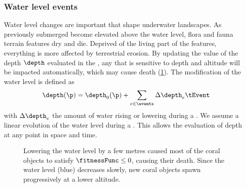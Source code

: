 \subsubsection{Water level events}
Water level changes are important  that shape underwater landscapes. As previously submerged  become elevated above the water level, flora and fauna terrain features dry and die. Deprived of the living part of the features, everything is more affected by terrestrial erosion. By updating the value of the depth $\depth$ evaluated in the , any  that is sensitive to depth and altitude will be impacted automatically, which may cause death (\cref{fig:env-obj-water-event}). The modification of the water level is defined as
\begin{align}
    \depth(\p) = \depth_0(\p) + \sum_{e \in \events} \Delta \depth_e \tEvent
\end{align}
with $\Delta \depth_e$ the amount of water rising or lowering during a . We assume a linear evolution of the water level during a . This allows the evaluation of depth at any point in space and time.

\begin{figure}
    \caption{Lowering the water level by a few metres caused most of the coral objects to satisfy $\fitnessFunc \leq 0$, causing their death. Since the water level (blue) decreases slowly, new coral objects spawn progressively at a lower altitude.}
    \label{fig:env-obj-water-event}
\end{figure}

